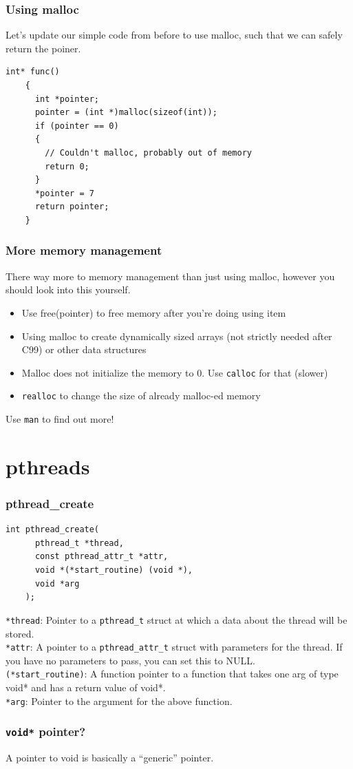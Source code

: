 \documentclass{beamer}
\begin{document}
\begin{frame}[fragile]
  \frametitle{Using malloc}
  Let's update our simple code from before to use malloc, such that we can safely return the poiner.
  \begin{lstlisting}[style=customc]
    int* func()
    {
      int *pointer;
      pointer = (int *)malloc(sizeof(int));
      if (pointer == 0)
      {
        // Couldn't malloc, probably out of memory
        return 0;
      }
      *pointer = 7
      return pointer;
    }
    \end{lstlisting}
\end{frame}
\begin{frame}
  \frametitle{More memory management}
  There way more to memory management than just using malloc, however you should look into this yourself.
  \begin{itemize}
    \item Use free(pointer) to free memory after you're doing using item
    \item Using malloc to create dynamically sized arrays (not strictly needed after C99) or other data structures
    \item Malloc does not initialize the memory to 0. Use \texttt{calloc} for that (slower)
    \item \texttt{realloc} to change the size of already malloc-ed memory
  \end{itemize}
  Use \texttt{man} to find out more!
\end{frame}
\section{pthreads}
\begin{frame}[fragile]
  \frametitle{pthread\_create}
  \begin{lstlisting}[style=customc]
    int pthread_create(
      pthread_t *thread, 
      const pthread_attr_t *attr, 
      void *(*start_routine) (void *), 
      void *arg
    );
  \end{lstlisting}
  \texttt{*thread}: Pointer to a \texttt{pthread\_t} struct at which a data about the thread will be stored.\\
  \pause
  \texttt{*attr}: A pointer to a \texttt{pthread\_attr\_t} struct with parameters for the thread. If you have no parameters to pass, you can set this to NULL.\\
  \pause
  \texttt{(*start\_routine)}: A function pointer to a function that takes one arg of type void* and has a return value of void*.\\
  \pause
  \texttt{*arg}: Pointer to the argument for the above function.
\end{frame}
\begin{frame}
  \frametitle{\texttt{void*} pointer?}
  A pointer to void is basically a ``generic'' pointer.
\end{frame}
\end{document}
